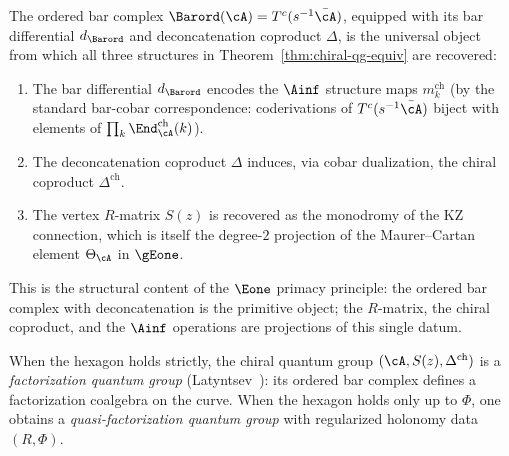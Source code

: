 \begin{corollary}
\label{cor:bar-encodes-all}
The ordered bar complex $\Barord(\cA) = T^c(s^{-1}\bar{\cA})$,
equipped with its bar differential $d_{\Barord}$ and
deconcatenation coproduct $\Delta$, is the universal
object from which all three structures in
Theorem~\textup{\ref{thm:chiral-qg-equiv}} are recovered:
\begin{enumerate}[label=\textup{(\roman*)}]
\item The bar differential $d_{\Barord}$ encodes the
  $\Ainf$ structure maps $m_k^{\mathrm{ch}}$
  \textup{(}by the standard bar-cobar correspondence:
  coderivations of $T^c(s^{-1}\bar{\cA})$ biject with
  elements of $\prod_k \End^{\mathrm{ch}}_\cA(k)$\textup{)}.
\item The deconcatenation coproduct $\Delta$ induces,
  via cobar dualization, the chiral coproduct
  $\Delta^{\mathrm{ch}}$.
\item The vertex $R$-matrix $S(z)$ is recovered as the
  monodromy of the KZ connection, which is itself the
  degree-$2$ projection of the Maurer--Cartan element
  $\Theta_\cA$ in $\gEone$.
\end{enumerate}
This is the structural content of the $\Eone$ primacy
principle: the ordered bar complex with deconcatenation
is the primitive object; the $R$-matrix, the chiral
coproduct, and the $\Ainf$ operations are projections of
this single datum.
\end{corollary}

\begin{remark}
\label{rem:factorization-qg}
When the hexagon holds strictly, the chiral quantum group
$(\cA, S(z), \Delta^{\mathrm{ch}})$ is a
\emph{factorization quantum group}
(Latyntsev~\cite{Latyntsev23}): its ordered bar complex
defines a factorization coalgebra on the curve. When the
hexagon holds only up to $\Phi$, one obtains a
\emph{quasi-factorization quantum group} with regularized
holonomy data $(R, \Phi)$.
\end{remark}


